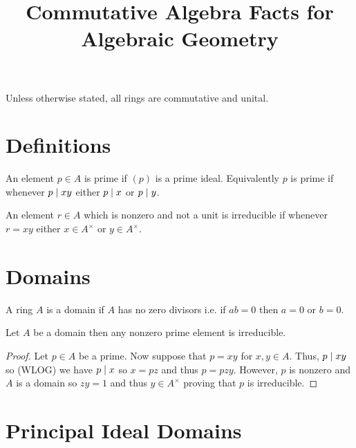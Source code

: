\documentclass[12pt]{article}
\begin{document}
\title{Commutative Algebra Facts for Algebraic Geometry}

\maketitle

\tableofcontents

\begin{remark}
Unless otherwise stated, all rings are commutative and unital.
\end{remark}

\section{Definitions}

\begin{definition}
An element $p \in A$ is prime if $(p)$ is a prime ideal. Equivalently $p$ is prime if whenever $p \mid xy$ either $p \mid x$ or $p \mid y$.
\end{definition}

\begin{definition}
An element $r \in A$ which is nonzero and not a unit is irreducible if whenever $r = xy$ either $x \in A^\times$ or $y \in A^\times$. 
\end{definition}

\section{Domains}

\begin{definition}
A ring $A$ is a domain if $A$ has no zero divisors i.e. if $ab = 0$ then $a = 0$ or $b = 0$.
\end{definition}

\begin{proposition}
Let $A$ be a domain then any nonzero prime element is irreducible. 
\end{proposition}

\begin{proof}
Let $p \in A$ be a prime. Now suppose that $p = xy$ for $x,y \in A$. Thus, $p \mid xy$ so (WLOG) we have $p \mid x$ so $x = pz$ and thus $p = pzy$. However, $p$ is nonzero and $A$ is a domain so $zy = 1$ and thus $y \in A^\times$ proving that $p$ is irreducible. 
\end{proof}

\section{Principal Ideal Domains}
\end{document}
